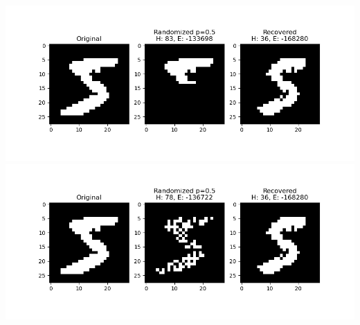 \documentclass{article}
\begin{document}
	\begin{center}
	\includegraphics[scale=0.5]{../img/digits_result_good_covered.png}	
	\includegraphics[scale=0.5]{../img/digits_result_good_random.png}	
	\end{center}	
	
\end{document}
